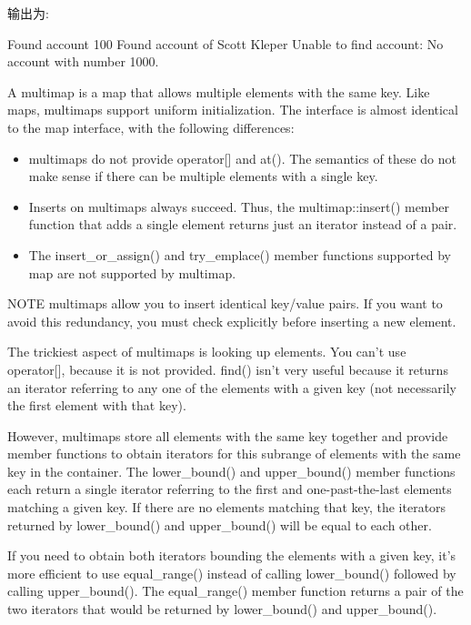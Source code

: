 输出为:

\begin{shell}
Found account 100
Found account of Scott Kleper
Unable to find account: No account with number 1000.
\end{shell}


A multimap is a map that allows multiple elements with the same key. Like maps, multimaps support uniform initialization. The interface is almost identical to the map interface, with the following differences:

\begin{itemize}
\item
multimaps do not provide operator[] and at(). The semantics of these do not make sense if there can be multiple elements with a single key.

\item
Inserts on multimaps always succeed. Thus, the multimap::insert() member function that adds a single element returns just an iterator instead of a pair.

\item
The insert\_or\_assign() and try\_emplace() member functions supported by map are not supported by multimap.
\end{itemize}

\begin{myNotic}{NOTE}
multimaps allow you to insert identical key/value pairs. If you want to avoid this redundancy, you must check explicitly before inserting a new element.
\end{myNotic}

The trickiest aspect of multimaps is looking up elements. You can’t use operator[], because it is not provided. find() isn’t very useful because it returns an iterator referring to any one of the elements with a given key (not necessarily the first element with that key).

However, multimaps store all elements with the same key together and provide member functions to obtain iterators for this subrange of elements with the same key in the container. The lower\_bound() and upper\_bound() member functions each return a single iterator referring to the first and one-past-the-last elements matching a given key. If there are no elements matching that key, the iterators returned by lower\_bound() and upper\_bound() will be equal to each other.

If you need to obtain both iterators bounding the elements with a given key, it’s more efficient to use equal\_range() instead of calling lower\_bound() followed by calling upper\_bound(). The equal\_range() member function returns a pair of the two iterators that would be returned by lower\_bound() and upper\_bound().

